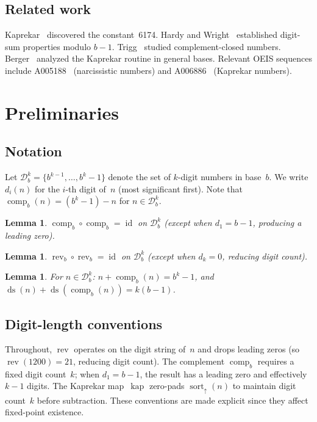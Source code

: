 \documentclass[11pt,a4paper]{amsart}
\theoremstyle{plain}
\newtheorem{lemma}[theorem]{Lemma}
\theoremstyle{definition}
\theoremstyle{remark}
\DeclareMathOperator{\rev}{rev}
\DeclareMathOperator{\comp}{comp}
\DeclareMathOperator{\sort}{sort}
\DeclareMathOperator{\kap}{kap}
\DeclareMathOperator{\ds}{ds}
\DeclareMathOperator{\id}{id}
\begin{document}
\subsection{Related work}
Kaprekar~\cite{Kaprekar1955} discovered the constant~6174.
Hardy and Wright~\cite{HardyWright2008} established digit-sum properties
modulo $b{-}1$. Trigg~\cite{Trigg1972} studied complement-closed numbers.
Berger~\cite{Berger1992} analyzed the Kaprekar routine in general bases.
Relevant OEIS sequences include A005188~\cite{OEIS-A005188} (narcissistic
numbers) and A006886~\cite{OEIS-A006886} (Kaprekar numbers).

\section{Preliminaries}\label{sec:prelim}

\subsection{Notation}
Let $\mathcal{D}_b^k = \{b^{k-1}, \ldots, b^k - 1\}$ denote the set of
$k$-digit numbers in base~$b$. We write $d_i(n)$ for the $i$-th digit of~$n$
(most significant first). Note that $\comp_b(n) = (b^k - 1) - n$ for
$n \in \mathcal{D}_b^k$.

\begin{lemma}\label{lem:comp-involution}
$\comp_b \circ \comp_b = \id$ on $\mathcal{D}_b^k$
(except when $d_1 = b{-}1$, producing a leading zero).
\end{lemma}

\begin{lemma}\label{lem:rev-involution}
$\rev_b \circ \rev_b = \id$ on $\mathcal{D}_b^k$
(except when $d_k = 0$, reducing digit count).
\end{lemma}

\begin{lemma}\label{lem:comp-sum}
For $n \in \mathcal{D}_b^k$: $n + \comp_b(n) = b^k - 1$,
and $\ds(n) + \ds(\comp_b(n)) = k(b{-}1)$.
\end{lemma}

\subsection{Digit-length conventions}\label{subsec:digit-policy}
Throughout, $\rev$ operates on the digit string of~$n$ and drops leading
zeros (so $\rev(1200) = 21$, reducing digit count). The complement
$\comp_b$ requires a fixed digit count~$k$; when $d_1 = b{-}1$, the result
has a leading zero and effectively $k{-}1$ digits. The Kaprekar map~$\kap$
zero-pads $\sort_\uparrow(n)$ to maintain digit count~$k$ before subtraction.
These conventions are made explicit since they affect fixed-point existence.
\end{document}
